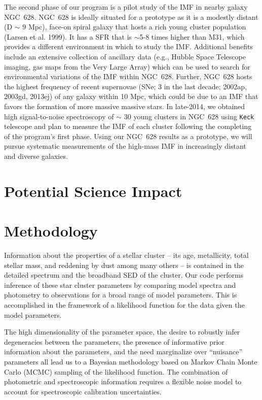 \documentclass[11pt,preprint]{aastex}
\begin{document}
The second phase of our program is a pilot study of the IMF in nearby galaxy NGC~628.  NGC~628 is ideally situated for a prototype as it is a modestly distant (D $\sim$ 9 Mpc), face-on spiral galaxy that hosts a rich young cluster population (Larsen et al. 1999).  It has a SFR that is $\sim$5-8 times higher than M31, which provides a different environment in which to study the IMF.  Additional benefits include an extensive collection of ancillary data (e.g., Hubble Space Telescope imaging, gas maps from the Very Large Array) which can be used to search for environmental variations of the IMF within NGC~628.  Further, NGC~628 hosts the highest frequency of recent supernovae (SNe; 3 in the last decade;  2002ap, 2003gd, 2013ej) of any galaxy within 10 Mpc, which could be due to an IMF that favors the formation of more massive massive stars. In late-2014, we obtained high signal-to-noise spectroscopy of $\sim$ 30 young clusters in NGC~628 using \texttt{Keck} telescope and plan to measure the IMF of each cluster following the completing of the program's first phase.  Using our NGC~628 results as a prototype, we will pursue systematic measurements of the high-mass IMF in increasingly distant and diverse galaxies.

\section{Potential Science Impact}





\section{Methodology}

Information about the properties of a stellar cluster -- its age, metallicity, total stellar mass, and reddening by dust among many others -- is contained in the detailed spectrum and the broadband SED of the cluster. 
Our code performs inference of these star cluster parameters by comparing model spectra and photometry to observations for a broad range of model parameters.  
This is accomplished in the framework of a likelihood function for the data given the model parameters.  

The high dimensionality of the parameter space, the desire to robustly infer degeneracies between the parameters, the presence of informative prior information about the parameters, and the need marginalize over ``nuisance'' parameters all lead us to a Bayesian methodology based on Markov Chain Monte Carlo (MCMC) sampling of the likelihood function. 
The combination of photometric and spectroscopic information requires a flexible noise model to account for spectroscopic calibration uncertainties.
\end{document}
